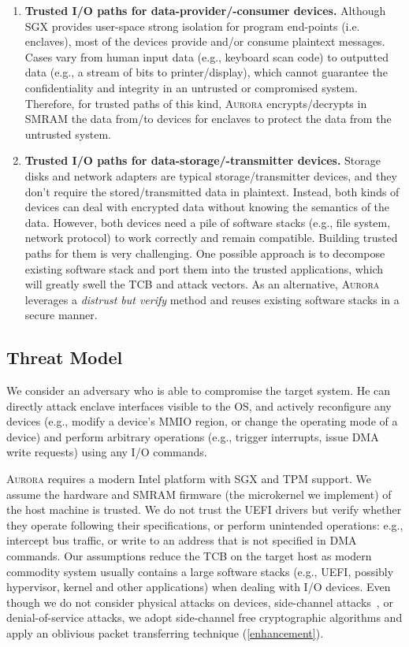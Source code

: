 \begin{enumerate}

\item \textbf{Trusted I/O paths for data-provider/-consumer devices.}
Although SGX provides user-space strong isolation for program end-points (i.e. enclaves), most of the devices provide and/or consume plaintext messages. Cases vary from human input data (e.g., keyboard scan code) to outputted data (e.g., a stream of bits to printer/display), which cannot guarantee the confidentiality and integrity in an untrusted or compromised system. Therefore, for trusted paths of this kind, \textsc{Aurora} encrypts/decrypts in SMRAM the data from/to devices for enclaves to protect the data from the untrusted system.

\item \textbf{Trusted I/O paths for data-storage/-transmitter devices.} Storage disks and network adapters are typical storage/transmitter devices, and they don't require the stored/transmitted data in plaintext. Instead, both kinds of devices can deal with encrypted data without knowing the semantics of the data. However, both devices need a pile of software stacks (e.g., file system, network protocol) to work correctly and remain compatible. Building trusted paths for them is very challenging. One possible approach is to decompose existing software stack and port them into the trusted applications, which will greatly swell the TCB and attack vectors. As an alternative, \textsc{Aurora} leverages a \emph{distrust but verify} method and reuses existing software stacks in a secure manner.

\end{enumerate}

\subsection{Threat Model}
We consider an adversary who is able to compromise the target system. He can directly attack enclave interfaces visible to the OS, and actively reconfigure any devices (e.g., modify a device’s MMIO region, or change the operating mode of a device) and perform arbitrary operations (e.g., trigger interrupts, issue DMA write requests) using any I/O commands.

\textsc{Aurora} requires a modern Intel platform with SGX and TPM support. We assume the hardware and SMRAM firmware (the microkernel we implement) of the host machine is trusted. We do not trust the UEFI drivers but verify whether they operate following their specifications, or perform unintended operations: e.g., intercept bus traffic, or write to an address that is not specified in DMA commands. Our assumptions  reduce the TCB on the target host as modern commodity system usually contains a large software stacks (e.g., UEFI, possibly hypervisor, kernel and other applications) when dealing with I/O devices.
Even though we do not consider physical attacks on devices, side-channel attacks~\cite{chen2019sgxpectre, ridl}, or denial-of-service attacks, we adopt side-channel free cryptographic algorithms and apply an oblivious packet transferring technique (\autoref{enhancement}).



